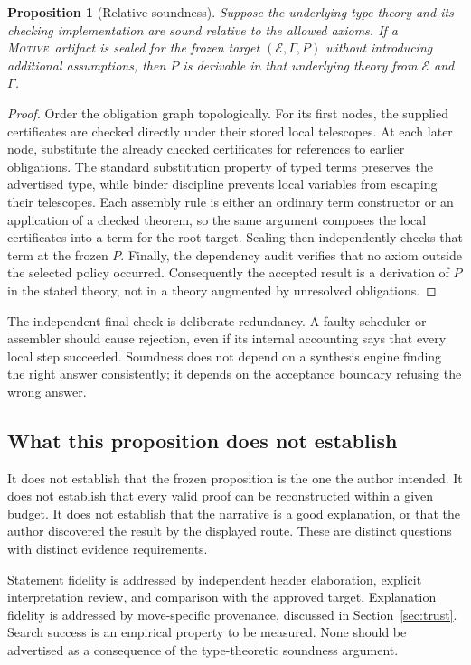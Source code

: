 \documentclass[11pt,a4paper]{article}
\newcommand{\Motive}{\textnormal{\textsc{Motive}}}
\newcommand{\E}{\mathcal E}
\newtheorem{proposition}{Proposition}[section]
\theoremstyle{remark}
\begin{document}
\begin{proposition}[Relative soundness]
Suppose the underlying type theory and its checking implementation are sound relative to the allowed axioms. If a \Motive\ artifact is sealed for the frozen target $(\E,\Gamma,P)$ without introducing additional assumptions, then $P$ is derivable in that underlying theory from $\E$ and $\Gamma$.
\end{proposition}
\begin{proof}
Order the obligation graph topologically. For its first nodes, the supplied certificates are checked directly under their stored local telescopes. At each later node, substitute the already checked certificates for references to earlier obligations. The standard substitution property of typed terms preserves the advertised type, while binder discipline prevents local variables from escaping their telescopes. Each assembly rule is either an ordinary term constructor or an application of a checked theorem, so the same argument composes the local certificates into a term for the root target. Sealing then independently checks that term at the frozen $P$. Finally, the dependency audit verifies that no axiom outside the selected policy occurred. Consequently the accepted result is a derivation of $P$ in the stated theory, not in a theory augmented by unresolved obligations.
\end{proof}
The independent final check is deliberate redundancy. A faulty scheduler or assembler should cause rejection, even if its internal accounting says that every local step succeeded. Soundness does not depend on a synthesis engine finding the right answer consistently; it depends on the acceptance boundary refusing the wrong answer.

\subsection{What this proposition does not establish}
It does not establish that the frozen proposition is the one the author intended. It does not establish that every valid proof can be reconstructed within a given budget. It does not establish that the narrative is a good explanation, or that the author discovered the result by the displayed route. These are distinct questions with distinct evidence requirements.

Statement fidelity is addressed by independent header elaboration, explicit interpretation review, and comparison with the approved target. Explanation fidelity is addressed by move-specific provenance, discussed in Section~\ref{sec:trust}. Search success is an empirical property to be measured. None should be advertised as a consequence of the type-theoretic soundness argument.
\end{document}
